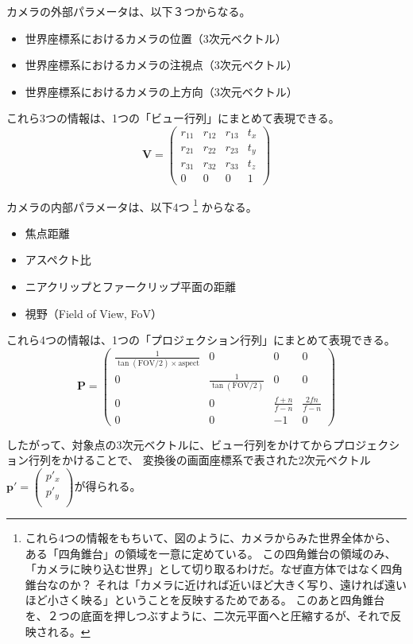 カメラの外部パラメータは、以下３つからなる。
\begin{itemize}
  \item 世界座標系におけるカメラの位置（3次元ベクトル）
  \item 世界座標系におけるカメラの注視点（3次元ベクトル）
  \item 世界座標系におけるカメラの上方向（3次元ベクトル）
\end{itemize}
これら3つの情報は、1つの「ビュー行列」にまとめて表現できる。
$$
\mathbf{V} = 
\begin{pmatrix}
r_{11} & r_{12} & r_{13} & t_x \\
r_{21} & r_{22} & r_{23} & t_y \\
r_{31} & r_{32} & r_{33} & t_z \\
0 & 0 & 0 & 1
\end{pmatrix}
$$


カメラの内部パラメータは、以下4つ
\footnote{
  これら4つの情報をもちいて、図のように、カメラからみた世界全体から、ある「四角錐台」の領域を一意に定めている。
  この四角錐台の領域のみ、「カメラに映り込む世界」として切り取るわけだ。なぜ直方体ではなく四角錐台なのか？
  それは「カメラに近ければ近いほど大きく写り、遠ければ遠いほど小さく映る」ということを反映するためである。
  このあと四角錐台を、２つの底面を押しつぶすように、二次元平面へと圧縮するが、それで反映される。
}
からなる。
\begin{itemize}
  \item 焦点距離
  \item アスペクト比
  \item ニアクリップとファークリップ平面の距離
  \item 視野（Field of View, FoV）
\end{itemize}
これら4つの情報は、1つの「プロジェクション行列」にまとめて表現できる。
$$
\mathbf{P} = 
\begin{pmatrix}
\frac{1}{\tan(\text{FOV}/2) \times \text{aspect}} & 0 & 0 & 0 \\
0 & \frac{1}{\tan(\text{FOV}/2)} & 0 & 0 \\
0 & 0 & \frac{f+n}{f-n} & \frac{2fn}{f-n} \\
0 & 0 & -1 & 0
\end{pmatrix}
$$

したがって、対象点の3次元ベクトルに、ビュー行列をかけてからプロジェクション行列をかけることで、
変換後の画面座標系で表された2次元ベクトル$\bm{p'} =
\begin{pmatrix}
  {p'_x} \\
  {p'_y} \\    
\end{pmatrix}
$が得られる。

